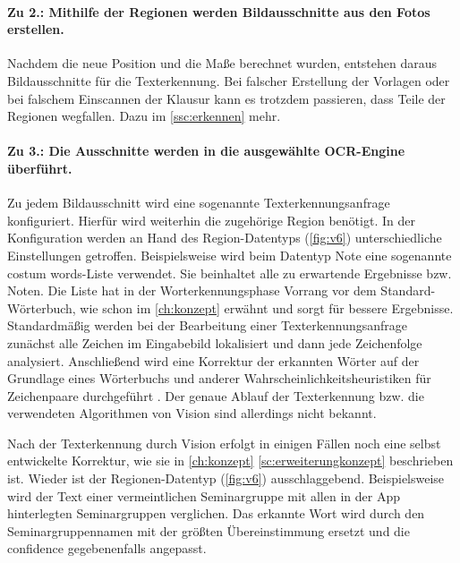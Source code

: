 \documentclass[notables, nomenclature, oneside, 150]{HSMW-Thesis}
\begin{document}
				\paragraph*{Zu 2.: Mithilfe der Regionen werden Bildausschnitte aus den Fotos erstellen.}
					Nachdem die neue Position und die Maße berechnet wurden, entstehen daraus Bildausschnitte für die Texterkennung. Bei falscher Erstellung der Vorlagen oder bei falschem Einscannen der Klausur kann es trotzdem passieren, dass Teile der Regionen wegfallen. Dazu im \autoref{ssc:erkennen} mehr.
				
				\paragraph*{Zu 3.: Die Ausschnitte werden in die ausgewählte OCR-Engine überführt.}
					Zu jedem Bildausschnitt wird eine sogenannte Texterkennungsanfrage konfiguriert. Hierfür wird weiterhin die zugehörige Region benötigt. In der Konfiguration werden an Hand des Region-Datentyps (\ref{fig:v6}) unterschiedliche Einstellungen getroffen. Beispielsweise wird beim Datentyp Note eine sogenannte costum words-Liste verwendet. Sie beinhaltet alle zu erwartende Ergebnisse bzw. Noten. Die Liste hat in der Worterkennungsphase Vorrang vor dem Standard-Wörterbuch, wie schon im \autoref{ch:konzept} erwähnt und sorgt für bessere Ergebnisse.						
					Standardmäßig werden bei der Bearbeitung einer Texterkennungsanfrage zunächst alle Zeichen im Eingabebild lokalisiert und dann jede Zeichenfolge analysiert. Anschließend wird eine Korrektur der erkannten Wörter auf der Grundlage eines Wörterbuchs und anderer Wahrscheinlichkeitsheuristiken für Zeichenpaare durchgeführt \cite{apple_text_2019}. Der genaue Ablauf der Texterkennung bzw. die verwendeten Algorithmen von Vision sind allerdings nicht bekannt. 
				
					Nach der Texterkennung durch Vision erfolgt in einigen Fällen noch eine selbst entwickelte Korrektur, wie sie in \autoref{ch:konzept} \autoref{sc:erweiterungkonzept} beschrieben ist. Wieder ist der Regionen-Datentyp (\ref{fig:v6}) ausschlaggebend. Beispielsweise wird der Text einer vermeintlichen Seminargruppe mit allen in der App hinterlegten Seminargruppen verglichen. Das erkannte Wort wird durch den Seminargruppennamen mit der größten Übereinstimmung ersetzt und die confidence gegebenenfalls angepasst.
				
\end{document}
